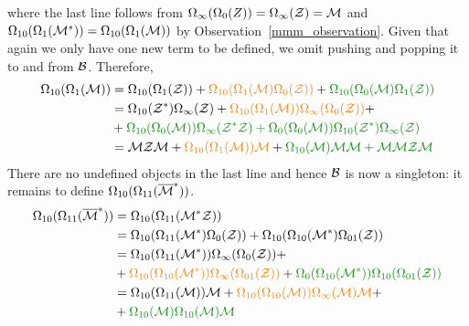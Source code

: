 \documentclass[12pt, a4paper, twoside]{report}
\begin{document}
where the last line follows from $\Omega_\infty(\Omega_0(Z)) = \Omega_\infty(\mathcal{Z}) = \mathcal{M}$ and $\Omega_{10}(\Omega_1(\mathcal{M}^*)) = \Omega_{10}(\Omega_1(\mathcal{M}))$ by Observation~\ref{mmm_observation}. Given that again we only have one new term to be defined, we omit pushing and popping it to and from $\mathcal{B}$. Therefore,
\begin{align}
  \begin{aligned}
    \Omega_{10}(\Omega_1(\M)) &= \Omega_{10}(\Omega_1(\Z)) + \textcolor{orange}{\Omega_{10}(\Omega_1(\M)\Omega_0(\Z))} + \textcolor{green}{\Omega_{10}(\Omega_0(\M)\Omega_1(\Z))}\\
    &= \Omega_{10}(\Zstar)\Omega_\infty(\Z) + \textcolor{orange}{\Omega_{10}(\Omega_1(\M))\Omega_\infty(\Omega_0(\Z))} +\\
    &+ \textcolor{green}{\Omega_{10}(\Omega_0(\M))\Omega_\infty(\Zstar\Z) + \Omega_0(\Omega_0(\M))\Omega_{10}(\Zstar)\Omega_\infty(\Z)}\\
    &= \M\Z\M + \textcolor{orange}{\Omega_{10}(\Omega_1(\M))\M} + \textcolor{green}{\Omega_{10}(\M)\M\M + \M\M\Z\M}
  \end{aligned}
      \label{eq:mmm_omega101M}
\end{align}
There are no undefined objects in the last line and hence $\mathcal{B}$ is now a singleton: it remains to define $\Omega_{10}(\Omega_{11}(\overline{\mathcal{M}}^*))$. 
\begin{align}
  \begin{aligned}
\Omega_{10}(\Omega_{11}(\barMstar)) &= \Omega_{10}(\Omega_{11}(\Mstar\Z))\quad\\
                                    &= \Omega_{10}(\Omega_{11}(\Mstar)\Omega_0(\Z)) + \Omega_{10}(\Omega_{10}(\Mstar)\Omega_{01}(\Z)) \\
                                    &= \Omega_{10}(\Omega_{11}(\Mstar))\Omega_\infty(\Omega_0(\Z)) +\\
                                    &+ \textcolor{orange}{\Omega_{10}(\Omega_{10}(\Mstar))\Omega_\infty(\Omega_{01}(\Z))} + \textcolor{green}{\Omega_0(\Omega_{10}(\Mstar))\Omega_{10}(\Omega_{01}(\Z))}\\
                                    &= \Omega_{10}(\Omega_{11}(\M))\M + \textcolor{orange}{\Omega_{10}(\Omega_{10}(\M))\Omega_\infty(\M)\M} +\\
                                    &+ \textcolor{green}{\Omega_{10}(\M)\Omega_{10}(\M)\M} \\
  \end{aligned}
\label{eq:mmm_lastterm}
\end{align}
\end{document}
